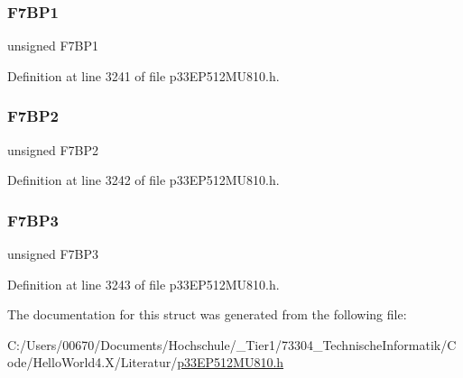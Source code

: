 \subsubsection{\texorpdfstring{F7\+B\+P1}{F7BP1}}
{\footnotesize\ttfamily unsigned F7\+B\+P1}



Definition at line 3241 of file p33\+E\+P512\+M\+U810.\+h.

\mbox{\label{structtag_c1_b_u_f_p_n_t2_b_i_t_s_ad17ad8a4e0bdc19525382cdbd924ad5c}} 
\subsubsection{\texorpdfstring{F7\+B\+P2}{F7BP2}}
{\footnotesize\ttfamily unsigned F7\+B\+P2}



Definition at line 3242 of file p33\+E\+P512\+M\+U810.\+h.

\mbox{\label{structtag_c1_b_u_f_p_n_t2_b_i_t_s_aad9539f9fb073db359d4b0c4ec752456}} 
\subsubsection{\texorpdfstring{F7\+B\+P3}{F7BP3}}
{\footnotesize\ttfamily unsigned F7\+B\+P3}



Definition at line 3243 of file p33\+E\+P512\+M\+U810.\+h.



The documentation for this struct was generated from the following file\+:\begin{DoxyCompactItemize}
\item 
C\+:/\+Users/00670/\+Documents/\+Hochschule/\+\_\+\+Tier1/73304\+\_\+\+Technische\+Informatik/\+Code/\+Hello\+World4.\+X/\+Literatur/\hyperlink{p33_e_p512_m_u810_8h}{p33\+E\+P512\+M\+U810.\+h}\end{DoxyCompactItemize}
